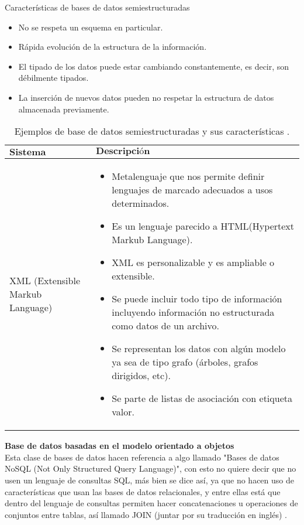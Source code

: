 Características de bases de datos semiestructuradas
\begin{itemize}
	\item No se respeta un esquema en particular.
	\item Rápida evolución de la estructura de la información.
	\item El tipado de los datos puede estar cambiando constantemente, es 
		decir, son  débilmente tipados.
	\item La inserción de nuevos datos pueden no respetar la estructura de 
		datos almacenada previamente.
\end{itemize}

\begin{table}[H]
	\centering 
	\caption{Ejemplos de base de datos semiestructuradas y sus 
		características \cite{db:ciencias:computacion}.}
	\begin{tabular*}{0.9\textwidth}{@{\extracolsep{\fill}} |l|l|}
		\hline
		$\textbf{Sistema}$ & $\textbf{Descripción}$
		\\\hline \hline
		\parbox[t]{3cm}{XML (Extensible Markub Language)} & 
		\parbox[t]{10.2cm}{
		\begin{itemize}
		\item Metalenguaje que nos permite definir lenguajes de marcado 
			adecuados a usos determinados. 
		\item Es un lenguaje parecido a HTML(Hypertext Markub Language).
		\item XML es personalizable y es ampliable o extensible. 
		\item Se puede incluir todo tipo de información incluyendo 
			información no estructurada como datos de un archivo. 
		\item Se representan los datos con algún modelo ya sea de tipo 
			grafo (árboles, grafos dirigidos, etc). 
		\item Se parte de listas de asociación con etiqueta valor.
		\end{itemize}
		} \\\hline
	\end{tabular*}
\end{table}

%
\textbf{Base de datos basadas en el modelo orientado a objetos} \\
Esta clase de bases de datos hacen referencia a algo llamado "Bases de datos 
NoSQL (Not Only Structured Query Language)", con esto no quiere decir que no 
usen un lenguaje de consultas SQL, más bien se dice así, ya que no hacen uso de 
características que usan las bases de datos relacionales, y entre ellas está que 
dentro del lenguaje de consultas permiten hacer concatenaciones u operaciones de 
conjuntos entre tablas, así llamado JOIN (juntar por su traducción en inglés) 
\cite{inv_storage_data}.

